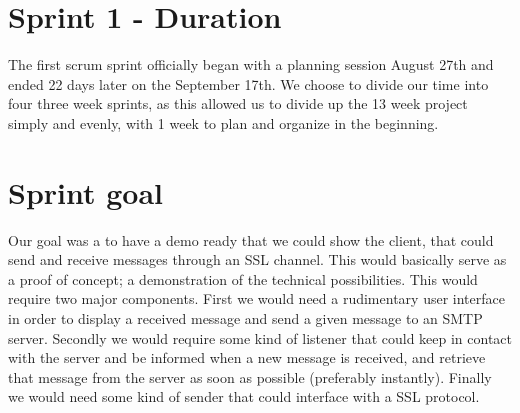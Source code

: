 \section{Sprint 1 - Duration}
The first scrum sprint officially began with a planning session August 27th and ended 22 days later on the September 17th. We choose to divide our time into four three week sprints, as this allowed us to divide up the 13 week project simply and evenly, with 1 week to plan and organize in the beginning.

\section{Sprint goal}
Our goal was a to have a demo ready that we could show the client, that could send and receive messages through an SSL channel. This would basically serve as a proof of concept; a demonstration of the technical possibilities. This would require two major components. First we would need a rudimentary user interface in order to display a received message and send a given message to an SMTP server. Secondly we would require some kind of listener that could keep in contact with the server and be informed when a new message is received, and retrieve that message from the server as soon as possible (preferably instantly). Finally we would need some kind of sender that could interface with a SSL protocol.